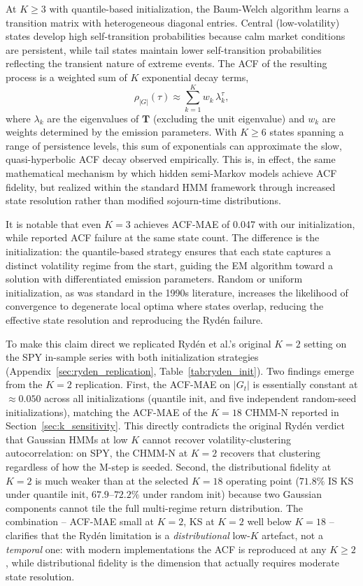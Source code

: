 At $K \geq 3$ with quantile-based initialization, the Baum-Welch algorithm learns a transition matrix with heterogeneous diagonal entries.
Central (low-volatility) states develop high self-transition probabilities because calm market conditions are persistent, while tail states maintain lower self-transition probabilities reflecting the transient nature of extreme events.
The ACF of the resulting process is a weighted sum of $K$ exponential decay terms,
\begin{equation}
    \rho_{|G|}(\tau) \approx \sum_{k=1}^{K} w_k \, \lambda_k^{\tau},
    \label{eq:acf_mixture}
\end{equation}
where $\lambda_k$ are the eigenvalues of $\mathbf{T}$ (excluding the unit eigenvalue) and $w_k$ are weights determined by the emission parameters.
With $K \geq 6$ states spanning a range of persistence levels, this sum of exponentials can approximate the slow, quasi-hyperbolic ACF decay observed empirically.
This is, in effect, the same mathematical mechanism by which hidden semi-Markov models \cite{bulla2006stylized} achieve ACF fidelity, but realized within the standard HMM framework through increased state resolution rather than modified sojourn-time distributions.

It is notable that even $K = 3$ achieves ACF-MAE of 0.047 with our initialization, while \citet{ryden1998stylized} reported ACF failure at the same state count.
The difference is the initialization: the quantile-based strategy ensures that each state captures a distinct volatility regime from the start, guiding the EM algorithm toward a solution with differentiated emission parameters.
Random or uniform initialization, as was standard in the 1990s literature, increases the likelihood of convergence to degenerate local optima where states overlap, reducing the effective state resolution and reproducing the Ryd\'{e}n failure.

To make this claim direct we replicated Ryd\'en et al.'s original $K = 2$ setting on the SPY in-sample series with both initialization strategies (Appendix~\ref{sec:ryden_replication}, Table~\ref{tab:ryden_init}).
Two findings emerge from the $K = 2$ replication.
First, the ACF-MAE on $|G_t|$ is essentially constant at $\approx 0.050$ across all initializations (quantile init, and five independent random-seed initializations), matching the ACF-MAE of the $K = 18$ CHMM-N reported in Section~\ref{sec:k_sensitivity}.
This directly contradicts the original Ryd\'en verdict that Gaussian HMMs at low $K$ cannot recover volatility-clustering autocorrelation: on SPY, the CHMM-N at $K = 2$ recovers that clustering regardless of how the M-step is seeded.
Second, the distributional fidelity at $K = 2$ is much weaker than at the selected $K = 18$ operating point ($71.8\%$ IS KS under quantile init, $67.9$--$72.2\%$ under random init) because two Gaussian components cannot tile the full multi-regime return distribution.
The combination -- ACF-MAE small at $K = 2$, KS at $K = 2$ well below $K = 18$ -- clarifies that the Ryd\'en limitation is a \emph{distributional} low-$K$ artefact, not a \emph{temporal} one: with modern implementations the ACF is reproduced at any $K \geq 2$, while distributional fidelity is the dimension that actually requires moderate state resolution.

